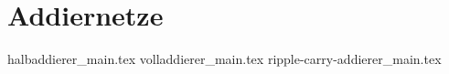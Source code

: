 
\part{Addiernetze}
\label{part:addiernetze}

{halbaddierer_main.tex}
{volladdierer_main.tex}
{ripple-carry-addierer_main.tex}
